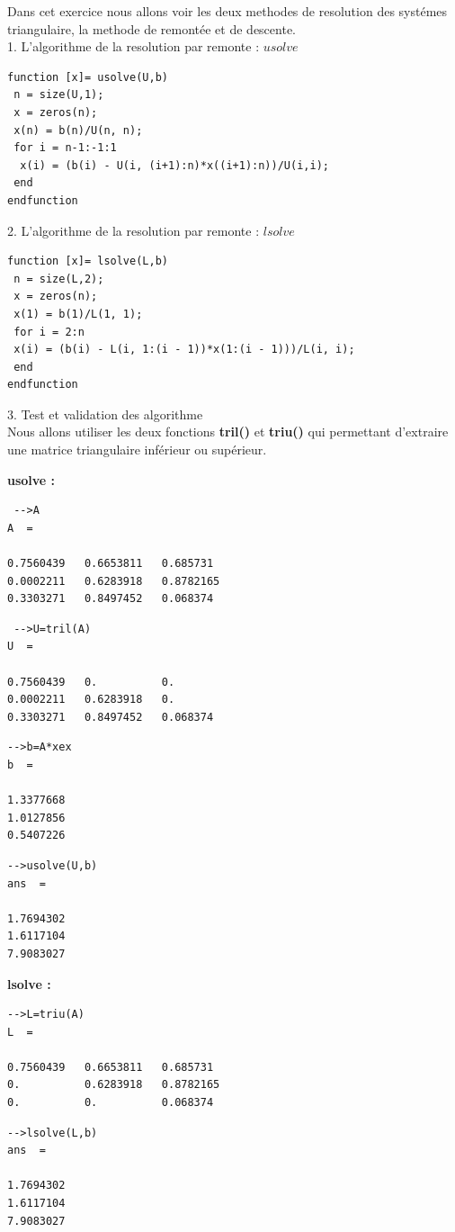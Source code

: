 \documentclass[12pt]{report}
\begin{document}
Dans cet exercice nous allons voir les deux methodes de resolution des systémes triangulaire, la methode de remontée et de descente.\\

1. L'algorithme de la resolution par remonte : $usolve$ 

\begin{lstlisting}
function [x]= usolve(U,b)
 n = size(U,1);
 x = zeros(n);
 x(n) = b(n)/U(n, n);
 for i = n-1:-1:1
  x(i) = (b(i) - U(i, (i+1):n)*x((i+1):n))/U(i,i);
 end
endfunction
\end{lstlisting} 
         
2. L'algorithme de la resolution par remonte : $lsolve$ 

\begin{lstlisting}
function [x]= lsolve(L,b)
 n = size(L,2);
 x = zeros(n);
 x(1) = b(1)/L(1, 1);
 for i = 2:n
 x(i) = (b(i) - L(i, 1:(i - 1))*x(1:(i - 1)))/L(i, i);
 end 
endfunction 
\end{lstlisting}          
 
3. Test et validation des algorithme\\

Nous allons utiliser les deux fonctions \textbf{tril()} et \textbf{triu()} qui permettant d'extraire une matrice triangulaire inférieur ou supérieur.

\textbf{usolve :}\\

\begin{lstlisting}
 -->A
A  = 

0.7560439   0.6653811   0.685731      
0.0002211   0.6283918   0.8782165      
0.3303271   0.8497452   0.068374
\end{lstlisting} 

\begin{lstlisting}
 -->U=tril(A)
U  = 

0.7560439   0.          0.      
0.0002211   0.6283918   0.      
0.3303271   0.8497452   0.068374
\end{lstlisting} 

\begin{lstlisting}
-->b=A*xex 
b  = 

1.3377668
1.0127856
0.5407226
\end{lstlisting} 

\begin{lstlisting}
-->usolve(U,b)
ans  =

1.7694302
1.6117104
7.9083027
\end{lstlisting} 

\textbf{lsolve :}\\

\begin{lstlisting}
-->L=triu(A)
L  = 

0.7560439   0.6653811   0.685731 
0.          0.6283918   0.8782165
0.          0.          0.068374 
\end{lstlisting} 

\begin{lstlisting}
-->lsolve(L,b)
ans  =

1.7694302
1.6117104
7.9083027
\end{lstlisting}
\end{document}
